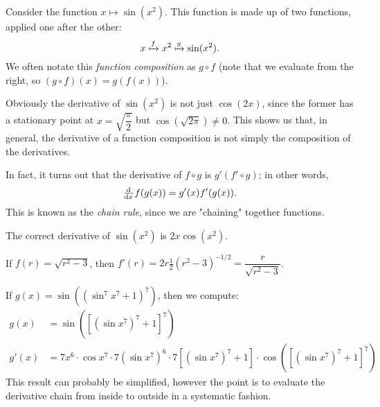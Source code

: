 


\begin{center}
\end{center}
Consider the function $ x \mapsto \sin (x^2) $. This function is made up of two
functions, applied one after the other:
\begin{displaymath}
  x \xmapsto{f} x^2 \xmapsto{g} \sin(x^2).
\end{displaymath}
We often notate this \textit{function composition} as $ g \circ f $ (note that we
evaluate from the right, so $ (g \circ f)(x) = g(f(x)) $).

Obviously the derivative of $ \sin(x^2) $ is not just $ \cos(2x) $, since the former
has a stationary point at $ x = \sqrt{\dfrac{\pi}{2}} $ but $ \cos(\sqrt{2\pi}) \neq 0 $. This
shows us that, in general, the derivative of a function composition is not simply the composition
of the derivatives.

In fact, it turns out that the derivative of $ f \circ g $ is $ g' (f' \circ g) $; in other words,
\begin{displaymath}
  \od{}{x} f(g(x)) = g'(x) f'(g(x)).
\end{displaymath}
This is known as the \textit{chain rule}, since we are "chaining" together functions.

\begin{ex}
  The correct derivative of $ \sin(x^2) $ is $ 2x \cos(x^2) $.
\end{ex}

\begin{ex}
  If $ f(r) = \sqrt{r^2 - 3} $, then $ f'(r) = 2r \frac{1}{2} \left(r^2 - 3\right)^{-1/2} = \dfrac{r}{\sqrt{r^2 - 3}} $.
\end{ex}

\begin{ex}
  If $ g(x) = \sin((\sin^7 x^7 + 1)^7) $, then we compute:
  \begin{align*}
    g(x)  &= \sin \left( \left[ \left( \sin x^7 \right)^7 + 1 \right]^7 \right)\\
    g'(x) &= 7x^6 \cdot \cos x^7 \cdot 7\left(\sin x^7\right)^6 \cdot 7\left[\left(\sin x^7\right)^7 + 1\right]
                  \cdot \cos \left( \left[ \left( \sin x^7 \right)^7 + 1 \right]^7 \right)
  \end{align*}
  This result can probably be simplified, however the point is to evaluate the derivative chain from inside to outside in a systematic fashion.
\end{ex}

